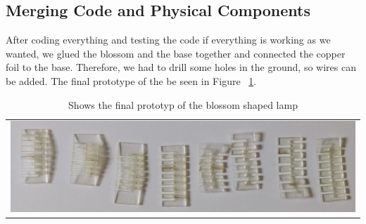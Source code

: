 \documentclass[doc.tex]{subfiles}
\begin{document}
    \subsection{Merging Code and Physical Components}
    \begin{flushleft}
        After coding everything and testing the code if everything is working as we wanted, we glued
        the blossom and the base together and connected the copper foil to the base. Therefore, we had 
        to drill some holes in the ground, so wires can be added. The final prototype of the be seen in 
        Figure ~\ref{fig:finalPrototyp}.
    \end{flushleft}

    \begin{table}[h!]
        \centering
        \begin{tabular}{c}
        \centering
        \includegraphics[width=.8\linewidth]{images/process/01_LaserCut.jpg}
        \end{tabular}
        \caption{Shows the final prototyp of the blossom shaped lamp}
        \label{fig:finalPrototyp}
    \end{table}
\end{document}
